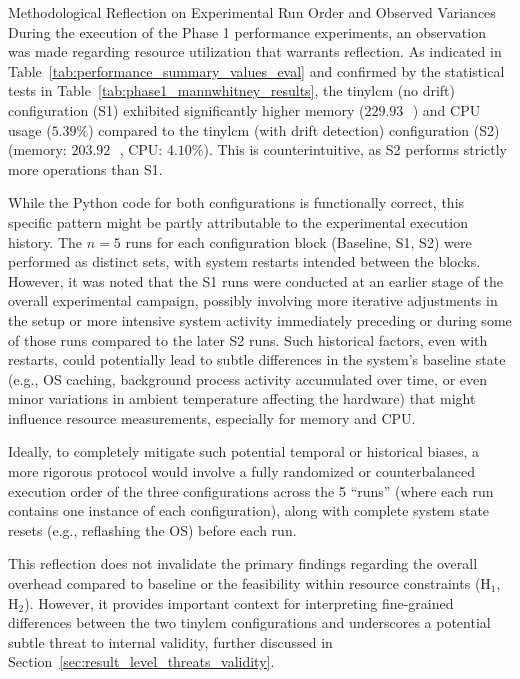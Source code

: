 \begin{MyBox}{Methodological Reflection on Experimental Run Order and Observed Variances}
    During the execution of the Phase 1 performance experiments, an observation was made regarding resource utilization that warrants reflection. As indicated in Table~\ref{tab:performance_summary_values_eval} and confirmed by the statistical tests in Table~\ref{tab:phase1_mannwhitney_results}, the \gls{tinylcm} (no drift) configuration (S1) exhibited significantly higher memory ($229.93$\,\si{\mega\byte}) and CPU usage ($5.39\%$) compared to the \gls{tinylcm} (with drift detection) configuration (S2) (memory: $203.92$\,\si{\mega\byte}, CPU: $4.10\%$). This is counterintuitive, as S2 performs strictly more operations than S1.

    While the Python code for both configurations is functionally correct, this specific pattern might be partly attributable to the experimental execution history. The $n=5$ runs for each configuration block (Baseline, S1, S2) were performed as distinct sets, with system restarts intended between the blocks. However, it was noted that the S1 runs were conducted at an earlier stage of the overall experimental campaign, possibly involving more iterative adjustments in the setup or more intensive system activity immediately preceding or during some of those runs compared to the later S2 runs. Such historical factors, even with restarts, could potentially lead to subtle differences in the system's baseline state (e.g., OS caching, background process activity accumulated over time, or even minor variations in ambient temperature affecting the hardware) that might influence resource measurements, especially for memory and CPU.

    Ideally, to completely mitigate such potential temporal or historical biases, a more rigorous protocol would involve a fully randomized or counterbalanced execution order of the three configurations across the 5 ``runs'' (where each run contains one instance of each configuration), along with complete system state resets (e.g., reflashing the OS) before each run.
    
    This reflection does not invalidate the primary findings regarding the overall overhead compared to baseline or the feasibility within resource constraints (H$_1$, H$_2$). However, it provides important context for interpreting fine-grained differences between the two \gls{tinylcm} configurations and underscores a potential subtle threat to internal validity, further discussed in Section~\ref{sec:result_level_threats_validity}.
\end{MyBox}

